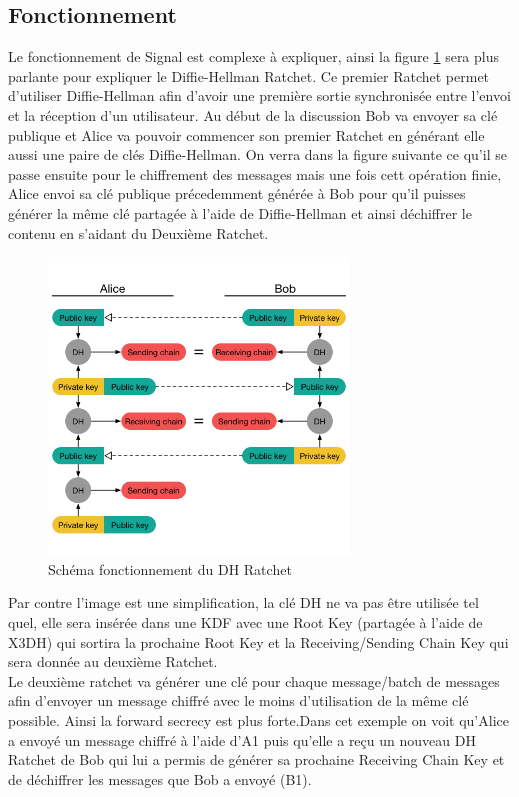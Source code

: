 \subsection{Fonctionnement}
Le fonctionnement de Signal est complexe à expliquer, ainsi la figure \ref{fig:signal} sera plus parlante pour expliquer le Diffie-Hellman Ratchet. Ce premier Ratchet permet d'utiliser Diffie-Hellman afin d'avoir une première sortie synchronisée entre l'envoi et la réception d'un utilisateur. Au début de la discussion Bob va envoyer sa clé publique et Alice va pouvoir commencer son premier Ratchet en générant elle aussi une paire de clés Diffie-Hellman. On verra dans la figure suivante ce qu'il se passe ensuite pour le chiffrement des messages mais une fois cett opération finie, Alice envoi sa clé publique précedemment générée à Bob pour qu'il puisses générer la même clé partagée à l'aide de Diffie-Hellman et ainsi déchiffrer le contenu en s'aidant du Deuxième Ratchet.
\begin{figure}[h!]
	\centering
	\includegraphics[width=8cm]{images/signalFonctionnement.png}
	\caption{Schéma fonctionnement du DH Ratchet\cite{doubleratchet}}
	\label{fig:signal}
\end{figure}
Par contre l'image est une simplification, la clé DH ne va pas être utilisée tel quel, elle sera insérée dans une KDF avec une Root Key (partagée à l'aide de X3DH) qui sortira la prochaine Root Key et la Receiving/Sending Chain Key qui sera donnée au deuxième Ratchet.\\
Le deuxième ratchet va générer une clé pour chaque message/batch de messages afin d'envoyer un message chiffré avec le moins d'utilisation de la même clé possible. Ainsi la forward secrecy est plus forte.Dans cet exemple on voit qu'Alice a envoyé un message chiffré à l'aide d'A1 puis qu'elle a reçu un nouveau DH Ratchet de Bob qui lui a permis de générer sa prochaine Receiving Chain Key et de déchiffrer les messages que Bob a envoyé (B1).
